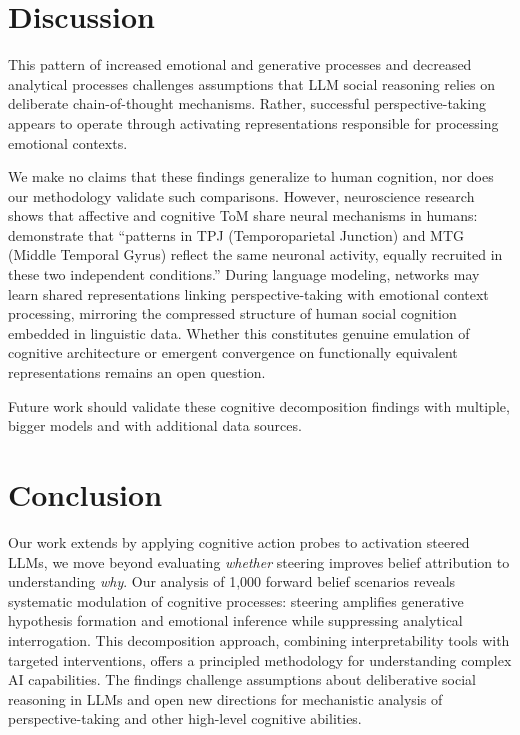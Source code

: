 \documentclass{article}
\begin{document}
\section{Discussion}

This pattern of increased emotional and generative processes and decreased analytical processes challenges assumptions that LLM social reasoning relies on deliberate chain-of-thought mechanisms. Rather, successful perspective-taking appears to operate through activating representations responsible for processing emotional contexts.

We make no claims that these findings generalize to human cognition, nor does our methodology validate such comparisons. However, neuroscience research shows that affective and cognitive ToM share neural mechanisms in humans: \citet{Corradi2014} demonstrate that ``patterns in TPJ (Temporoparietal Junction) and MTG (Middle Temporal Gyrus) reflect the same neuronal activity, equally recruited in these two independent conditions.'' During language modeling, networks may learn shared representations linking perspective-taking with emotional context processing, mirroring the compressed structure of human social cognition embedded in linguistic data. Whether this constitutes genuine emulation of cognitive architecture or emergent convergence on functionally equivalent representations remains an open question.

Future work should validate these cognitive decomposition findings with multiple, bigger models and with additional data sources.

\section{Conclusion}

Our work extends \citet{Bortoletto2024} by applying cognitive action probes to activation steered LLMs, we move beyond evaluating \textit{whether} steering improves belief attribution to understanding \textit{why}. Our analysis of 1,000 forward belief scenarios reveals systematic modulation of cognitive processes: steering amplifies generative hypothesis formation and emotional inference while suppressing analytical interrogation. This decomposition approach, combining interpretability tools with targeted interventions, offers a principled methodology for understanding complex AI capabilities. The findings challenge assumptions about deliberative social reasoning in LLMs and open new directions for mechanistic analysis of perspective-taking and other high-level cognitive abilities.
\end{document}
